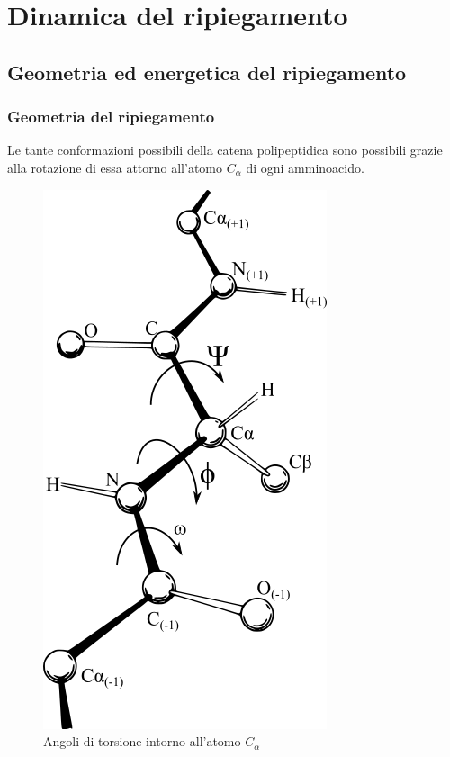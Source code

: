 \section{Dinamica del ripiegamento} \label{sec:assisted-folding}
{
{	
\subsection{Geometria ed energetica del ripiegamento}
{
	
\subsubsection{Geometria del ripiegamento}
Le tante conformazioni possibili della catena polipeptidica sono possibili grazie alla rotazione di essa attorno all'atomo $C_{\alpha}$ di ogni amminoacido.

\begin{figure}[!htb]
	\centering
	\includegraphics[scale=0.4]{images/angoli-torsione.png}
	\caption{Angoli di torsione intorno all'atomo $C_{\alpha}$}
	\label{fig:angoli-torsione}
\end{figure}

}}}
